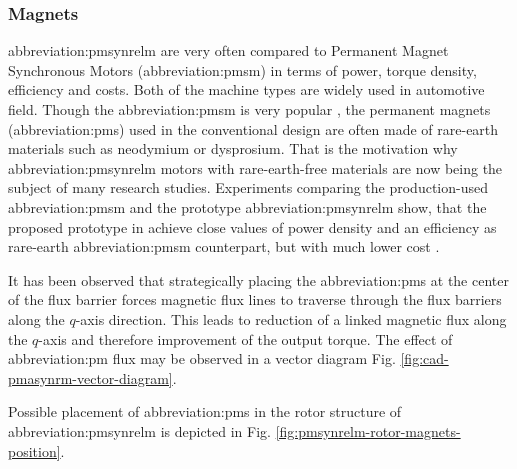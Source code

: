 \documentclass[a4paper, twoside, 11pt]{article}
\begin{document}
    \subsubsection{Magnets}
        \gls{abbreviation:pmsynrelm} are very often compared to Permanent Magnet Synchronous Motors (\gls{abbreviation:pmsm}) in terms of power, torque density, efficiency and costs. Both of the machine types are widely used in automotive field. Though the \gls{abbreviation:pmsm} is very popular \cite{morimoto-experimental-evaulation-of-a-rare-earth-free-pmasynrm-with-ferrite-magnets-for-automotive-applications}, the permanent magnets (\gls{abbreviation:pm}s) used in the conventional design are often made of rare-earth materials such as neodymium or dysprosium. That is the motivation why \gls{abbreviation:pmsynrelm} motors with rare-earth-free materials are now being the subject of many research studies. Experiments comparing the production-used \gls{abbreviation:pmsm} and the prototype \gls{abbreviation:pmsynrelm} show, that the proposed prototype in \cite{mashiro-performance-of-mpasynrm-with-ferrite-magnets-for-ev-hv-applications-considering-productivity} achieve close values of power density and an efficiency as rare-earth \gls{abbreviation:pmsm} counterpart, but with much lower cost \cite{haiwei-low-cost-ferrite-pm-assisted-synchronous-reluctance-machine-for-electric-vehicles}.\par
It has been observed that strategically placing the \gls{abbreviation:pm}s at the center of the flux barrier forces magnetic flux lines to traverse through the flux barriers along the $q$-axis direction. This leads to reduction of a linked magnetic flux along the $q$-axis and therefore improvement of the output torque. \cite{ibrahim-permanent-magnet-assisted-synchronous-reluctance-motor-employing-a-hybrid-star-delta-winding-for-high-speed-applicaitons, ngo-performance-analysis-of-synchronous-reluctance-motor-with-limited-amount-of-permanent-magnet} The effect of \gls{abbreviation:pm} flux may be observed in a vector diagram Fig. \ref{fig:cad-pmasynrm-vector-diagram}.\par
Possible placement of \gls{abbreviation:pm}s in the rotor structure of \gls{abbreviation:pmsynrelm} is depicted in Fig. \ref{fig:pmsynrelm-rotor-magnets-position}.
\end{document}

